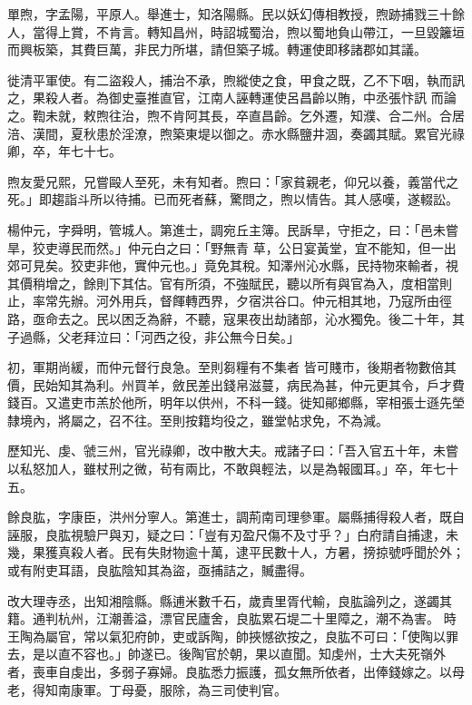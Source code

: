 \begin{pinyinscope}
 單煦，字孟陽，平原人。舉進士，知洛陽縣。民以妖幻傳相教授，煦跡捕戮三十餘人，當得上賞，不肯言。轉知昌州，時詔城蜀治，煦以蜀地負山帶江，一旦毀籬垣而興板築，其費巨萬，非民力所堪，請但築子城。轉運使即移諸郡如其議。



 徙清平軍使。有二盜殺人，捕治不承，煦縱使之食，甲食之既，乙不下咽，執而訊之，果殺人者。為御史臺推直官，江南人誣轉運使呂昌齡以賄，中丞張忭訊
 而論之。鞫未就，敕煦往治，煦不肯阿其長，卒直昌齡。乞外遷，知濮、合二州。合居涪、漢間，夏秋患於淫潦，煦築東堤以御之。赤水縣鹽井涸，奏蠲其賦。累官光祿卿，卒，年七十七。



 煦友愛兄熙，兄嘗毆人至死，未有知者。煦曰：「家貧親老，仰兄以養，義當代之死。」即趨詣斗所以待捕。已而死者蘇，驚問之，煦以情告。其人感嘆，遂輟訟。



 楊仲元，字舜明，管城人。第進士，調宛丘主簿。民訴旱，守拒之，曰：「邑未嘗旱，狡吏導民而然。」仲元白之曰：「野無青
 草，公日宴黃堂，宜不能知，但一出郊可見矣。狡吏非他，實仲元也。」竟免其稅。知澤州沁水縣，民持物來輸者，視其價稍增之，餘則下其估。官有所須，不強賦民，聽以所有與官為入，度相當則止，率常先辦。河外用兵，督餫轉西界，夕宿洪谷口。仲元相其地，乃寇所由徑路，亟命去之。民以困乏為辭，不聽，寇果夜出劫諸部，沁水獨免。後二十年，其子過縣，父老拜泣曰：「河西之役，非公無今日矣。」



 初，軍期尚緩，而仲元督行良急。至則芻糧有不集者
 皆可賤市，後期者物數倍其價，民始知其為利。州買羊，斂民差出錢帛滋蔓，病民為甚，仲元更其令，戶才費錢百。又遣吏市羔於他所，明年以供州，不科一錢。徙知鄖鄉縣，宰相張士遜先塋隸境內，將屬之，召不往。至則按籍均役之，雖堂帖求免，不為減。



 歷知光、虔、虢三州，官光祿卿，改中散大夫。戒諸子曰：「吾入官五十年，未嘗以私怒加人，雖杖刑之微，茍有兩比，不敢與輕法，以是為報國耳。」卒，年七十五。



 餘良肱，字康臣，洪州分寧人。第進士，調荊南司理參軍。屬縣捕得殺人者，既自誣服，良肱視驗尸與刃，疑之曰：「豈有刃盈尺傷不及寸乎？」白府請自捕逮，未幾，果獲真殺人者。民有失財物逾十萬，逮平民數十人，方暑，搒掠號呼聞於外；或有附吏耳語，良肱陰知其為盜，亟捕詰之，贓盡得。



 改大理寺丞，出知湘陰縣。縣逋米數千石，歲責里胥代輸，良肱論列之，遂蠲其籍。通判杭州，江潮善溢，漂官民廬舍，良肱累石堤二十里障之，潮不為害。
 時王陶為屬官，常以氣犯府帥，吏或訴陶，帥挾憾欲按之，良肱不可曰：「使陶以罪去，是以直不容也。」帥遂已。後陶官於朝，果以直聞。知虔州，士大夫死嶺外者，喪車自虔出，多弱子寡婦。良肱悉力振護，孤女無所依者，出俸錢嫁之。以母老，得知南康軍。丁母憂，服除，為三司使判官。




\end{pinyinscope}
